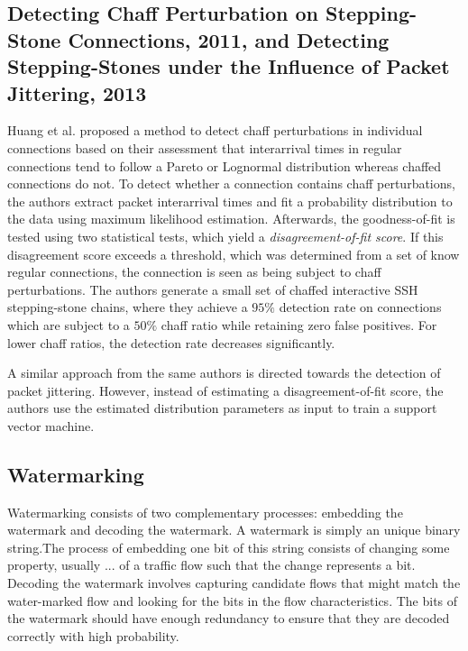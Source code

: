 \documentclass[conference]{IEEEtran}\usepackage[]{graphicx}\usepackage[]{color}
\begin{document}
\subsection{Detecting Chaff Perturbation on Stepping-Stone Connections, 2011, and Detecting Stepping-Stones under the  Influence of Packet Jittering, 2013}
Huang et al. \cite{huang2011detecting} proposed a method to detect chaff perturbations in individual connections based on their assessment that interarrival times in regular connections tend to follow a Pareto or Lognormal distribution whereas chaffed connections do not. To detect whether a connection contains chaff perturbations, the authors extract packet interarrival times and fit a probability distribution to the data using maximum likelihood estimation. Afterwards, the goodness-of-fit is tested using two statistical tests, which yield a \textit{disagreement-of-fit score}. If this disagreement score exceeds a threshold, which was determined from a set of know regular connections, the connection is seen as being subject to chaff perturbations. The authors generate a small set of chaffed interactive SSH stepping-stone chains, where they achieve a $95\%$ detection rate on connections which are subject to a $50\%$ chaff ratio while retaining zero false positives. For lower chaff ratios, the detection rate decreases significantly. 

A similar approach from the same authors \cite{ding2013detecting} is directed towards the detection of packet jittering. However, instead of estimating a disagreement-of-fit score, the authors use the estimated distribution parameters as input to train a support vector machine. 

\subsection{Watermarking}

Watermarking consists of two complementary processes: embedding the watermark and decoding the watermark. A watermark is simply an unique binary string.The process of embedding one bit of this string consists of changing some property, usually ... of a traffic flow such that the change represents a bit. Decoding the watermark involves capturing candidate flows that might match the water-marked flow and looking for the bits in the flow characteristics. The bits of the watermark should have enough redundancy to ensure that they are decoded correctly with high probability.
\end{document}
